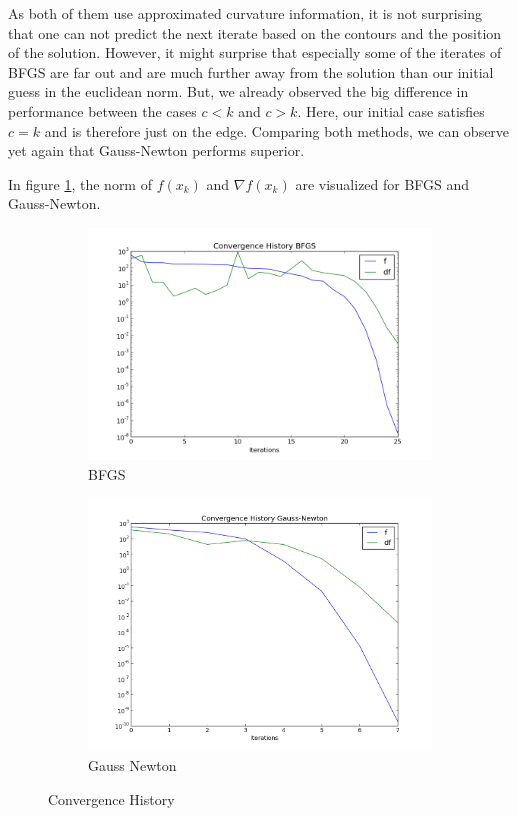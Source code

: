 \documentclass{article}
\begin{document}
As both of them use approximated curvature information, it is not surprising that one
can not predict the next iterate based on the contours and the position of the solution. However,
it might surprise that especially some of the iterates of BFGS are far out and are much further away from the solution than our initial guess in the euclidean norm. But, we already observed the
big difference in performance between the cases $c<k$ and $c>k$. Here, our initial case
satisfies $c=k$ and is therefore just on the edge. Comparing both methods, we can observe yet again that Gauss-Newton performs superior. \par
 In figure \ref{his}, the norm of $f(x_k)$ and $\nabla f(x_k)$ are visualized for BFGS and Gauss-Newton.
\begin{figure}
    \centering
    \begin{subfigure}[b]{0.45\textwidth}
        \includegraphics[width=\textwidth]{conv_his_bfgs}
        \caption{BFGS}
       
    \end{subfigure}
    \begin{subfigure}[b]{0.45\textwidth}
        \includegraphics[width=\textwidth]{conv_his_gauss}
        \caption{Gauss Newton}
       
    \end{subfigure}
    \caption{Convergence History}\label{his}
\end{figure} 
\end{document}
